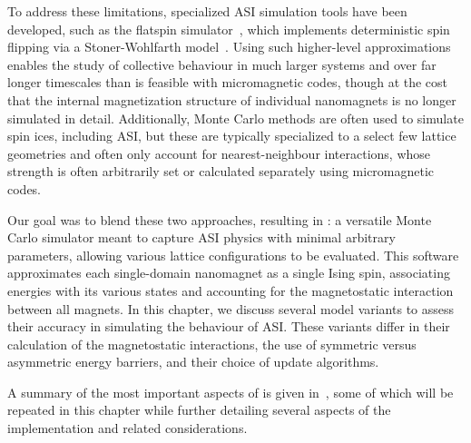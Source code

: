 To address these limitations, specialized ASI simulation tools have been developed, such as the flatspin simulator~\cite{flatspin}, which implements deterministic spin flipping via a Stoner-Wohlfarth model~\cite{StonerWohlfarth2008}.
Using such higher-level approximations enables the study of collective behaviour in much larger systems and over far longer timescales than is feasible with micromagnetic codes, though at the cost that the internal magnetization structure of individual nanomagnets is no longer simulated in detail.
Additionally, Monte Carlo methods are often used to simulate spin ices, including ASI, but these are typically specialized to a select few lattice geometries and often only account for nearest-neighbour interactions, whose strength is often arbitrarily set or calculated separately using micromagnetic codes.~\cite{MeltingASI,sklenar2019field,gilbert2014emergent,zhang2013crystallites} \\\par %

Our goal was to blend these two approaches, resulting in \hotspice: a versatile Monte Carlo simulator meant to capture ASI physics with minimal arbitrary parameters, allowing various lattice configurations to be evaluated.
This software approximates each single-domain nanomagnet as a single Ising spin, associating energies with its various states and accounting for the magnetostatic interaction between all magnets.
In this chapter, we discuss several model variants to assess their accuracy in simulating the behaviour of ASI.
These variants differ in their calculation of the magnetostatic interactions, the use of symmetric versus asymmetric energy barriers, and their choice of update algorithms. \\\par

A summary of the most important aspects of \hotspice is given in~\cite{MAES-24}, some of which will be repeated in this chapter while further detailing several aspects of the implementation and related considerations.

